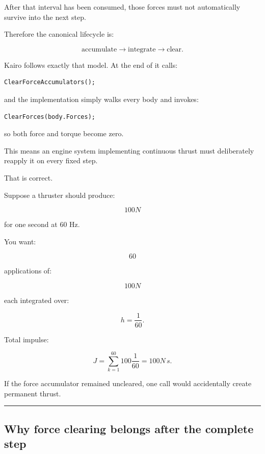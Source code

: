 After that interval has been consumed, those forces must not automatically survive into the next step.

Therefore the canonical lifecycle is:

\[
\boxed{
\text{accumulate}
\rightarrow
\text{integrate}
\rightarrow
\text{clear}.
}
\]

Kairo follows exactly that model. At the end of  it calls:

\begin{verbatim}
ClearForceAccumulators();
\end{verbatim}

and the implementation simply walks every body and invokes:

\begin{verbatim}
ClearForces(body.Forces);
\end{verbatim}

so both force and torque become zero.

This means an engine system implementing continuous thrust must deliberately reapply it on every fixed step.

That is correct.

Suppose a thruster should produce:

\[
100N
\]

for one second at 60 Hz.

You want:

\[
60
\]

applications of:

\[
100N
\]

each integrated over:

\[
h=\frac1{60}.
\]

Total impulse:

\[
J
=
\sum_{k=1}^{60}
100\frac1{60}
=
100N\,s.
\]

If the force accumulator remained uncleared, one call would accidentally create permanent thrust.

\begin{center}\rule{0.5\linewidth}{0.5pt}\end{center}

\subsection{Why force clearing belongs after the complete step}\label{06-engine-ii-ch038-why-force-clearing-belongs-after-the-complete-step}

